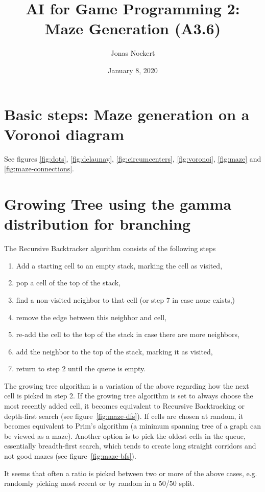 \documentclass[a4paper,12pt]{article}
\title{AI for Game Programming 2: Maze Generation (A3.6)}
\author{Jonas Nockert}
\date{\small January 8, 2020}
\begin{document}
\maketitle

\section*{Basic steps: Maze generation on a Voronoi diagram}
See figures \ref{fig:dots}, \ref{fig:delaunay}, \ref{fig:circumcenters},
\ref{fig:voronoi}, \ref{fig:maze} and \ref{fig:maze-connections}.

\section*{Growing Tree using the gamma distribution for branching}
The Recursive Backtracker algorithm consists of the following steps

\begin{enumerate}
  \item Add a starting cell to an empty stack, marking the cell as visited,
  \item pop a cell of the top of the stack,
  \item find a non-visited neighbor to that cell (or step 7 in case none exists,)
  \item remove the edge between this neighbor and cell,
  \item re-add the cell to the top of the stack in case there are more neighbors,
  \item add the neighbor to the top of the stack, marking it as visited,
  \item return to step 2 until the queue is empty.
\end{enumerate}

The growing tree algorithm is a variation of the above regarding how the
next cell is picked in step 2. If the growing tree algorithm is
set to always choose the most recently added cell, it becomes equivalent to
Recursive Backtracking or depth-first search (see
figure~\ref{fig:maze-dfs}). If cells are chosen at random,
it becomes equivalent to Prim's algorithm (a minimum spanning tree of a graph can
be viewed as a maze). Another option is to pick the oldest cells in the queue,
essentially breadth-first search, which tends to create long straight corridors
and not good mazes (see figure~\ref{fig:maze-bfs}).

It seems that often a ratio is picked between two or more of the above cases,
e.g. randomly picking most recent or by random in a 50/50 split.
\end{document}
